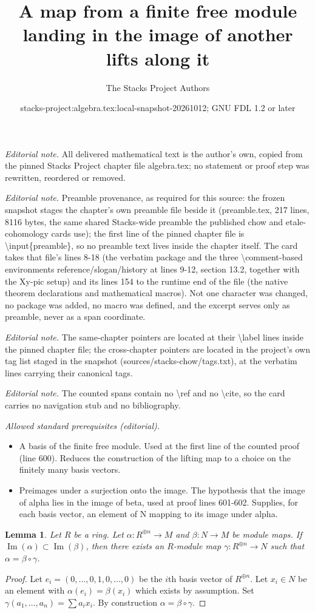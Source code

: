 \documentclass[10pt,a4paper]{amsart}
\title{A map from a finite free module landing in the image of another lifts along it}
\author{The Stacks Project Authors}
\date{stacks-project:algebra.tex:local-snapshot-20261012; GNU FDL 1.2 or later}
\theoremstyle{plain}
\newtheorem{lemma}[subsection]{Lemma}
\theoremstyle{definition}
\theoremstyle{remark}
\numberwithin{equation}{subsection}
\def\Im{\mathop{\mathrm{Im}}}
\begin{document}
\maketitle
\noindent\textit{Editorial note.} All delivered mathematical text is the author's own, copied from the pinned Stacks Project chapter file algebra.tex; no statement or proof step was rewritten, reordered or removed.\par\medskip
\noindent\textit{Editorial note.} Preamble provenance, as required for this source: the frozen snapshot stages the chapter's own preamble file beside it (preamble.tex, 217 lines, 8116 bytes, the same shared Stacks-wide preamble the published chow and etale-cohomology cards use); the first line of the pinned chapter file is \textbackslash{}input\{preamble\}, so no preamble text lives inside the chapter itself. The card takes that file's lines 8-18 (the verbatim package and the three \textbackslash{}comment-based environments reference/slogan/history at lines 9-12, section 13.2, together with the Xy-pic setup) and its lines 154 to the runtime end of the file (the native theorem declarations and mathematical macros). Not one character was changed, no package was added, no macro was defined, and the excerpt serves only as preamble, never as a span coordinate.\par\medskip
\noindent\textit{Editorial note.} The same-chapter pointers are located at their \textbackslash{}label lines inside the pinned chapter file; the cross-chapter pointers are located in the project's own tag list staged in the snapshot (sources/stacks-chow/tags.txt), at the verbatim lines carrying their canonical tags.\par\medskip
\noindent\textit{Editorial note.} The counted spans contain no \textbackslash{}ref and no \textbackslash{}cite, so the card carries no navigation stub and no bibliography.\par\medskip
\noindent\textit{Allowed standard prerequisites (editorial).}\begin{itemize}
\item A basis of the finite free module. Used at the first line of the counted proof (line 600). Reduces the construction of the lifting map to a choice on the finitely many basis vectors.
\item Preimages under a surjection onto the image. The hypothesis that the image of alpha lies in the image of beta, used at proof lines 601-602. Supplies, for each basis vector, an element of N mapping to its image under alpha.
\end{itemize}\medskip
\begin{lemma}
\label{lemma-lift-map}
Let $R$ be a ring. Let $\alpha : R^{\oplus n} \to M$ and $\beta : N \to M$ be
module maps. If $\Im(\alpha) \subset \Im(\beta)$, then there
exists an $R$-module map $\gamma : R^{\oplus n} \to N$ such that
$\alpha = \beta \circ \gamma$.
\end{lemma}

\begin{proof}
Let $e_i = (0, \ldots, 0, 1, 0, \ldots, 0)$ be the $i$th basis vector
of $R^{\oplus n}$. Let $x_i \in N$ be an element with
$\alpha(e_i) = \beta(x_i)$ which exists by assumption. Set
$\gamma(a_1, \ldots, a_n) = \sum a_i x_i$. By construction
$\alpha = \beta \circ \gamma$.
\end{proof}
\end{document}
